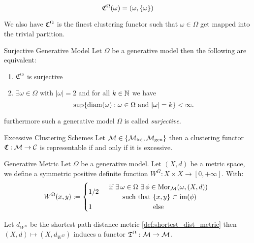 \begin{myremark}{}{}

$$
\mathfrak{C}^\Omega(\omega) = (\omega, \{\omega\})
$$

We also have $\mathfrak{C}^\Omega$ is the finest clustering functor such that $\omega \in \Omega$ get mapped into the trivial partition.
\end{myremark}

\begin{proposition}{Surjective Generative Model}{}
\newresult
Let $\Omega$ be a generative model then the following are equivalent:
\begin{enumerate}
    \item $\mathfrak{C}^\Omega$ is surjective
    \item $\exists \omega \in \Omega$ with $|\omega| = 2$ and for all $k \in \mathbb N$ we have 
    $$
    \sup\{\mathrm{diam}(\omega): \omega \in \Omega \text{ and } |\omega| = k\} < \infty.
    $$ 
\end{enumerate}
furthermore such a generative model $\Omega$ is called \emph{surjective}.
\end{proposition}





\begin{theorem}{Excessive Clustering Schemes}{}
Let $\mathcal{M} \in \{{\mathcal{M}_\mathrm{inj}}, {\mathcal{M}_\mathrm{gen}}\}$ then a clustering functor $\mathfrak{C}: \mathcal{M} \to \mathcal{C}$ is representable if and only if it is excessive.
\end{theorem}

\begin{definition}{Generative Metric \cite{Carlsson2010}}{}
Let $\Omega$ be a generative model. Let $(X,d)$ be a metric space, we define a symmetric positive definite function $W^\Omega: X \times X \to [0,+\infty]$. With:
\begin{equation*}
W^\Omega(x,y) := \begin{cases}
    1/2 & 
    \begin{array}{cc}
         \text{if } \exists \, \omega \in \Omega \ \exists \, \phi \in \mor_{\M}(\omega, (X,d))\\
         \text{ such that } \{x,y\} \subset \image(\phi)
    \end{array}\\
    1 & \hfil \text{else}
\end{cases}
\end{equation*}
\end{definition}




\begin{myremark}{}{}
Let $d_{W^\Omega}$ be the shortest path distance metric \ref{def:shortest_dist_metric} then $(X,d) \mapsto (X,d_{W^\Omega})$ induces a functor $\mathfrak{T}^\Omega: \mathcal{M} \to \mathcal{M}$.
\end{myremark}

